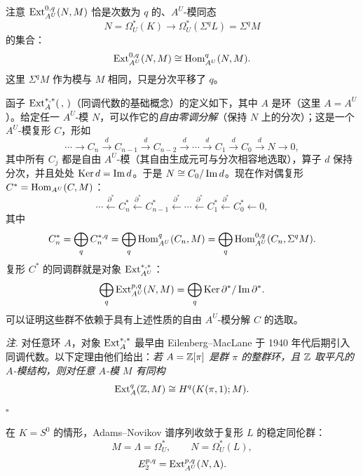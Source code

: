 注意 $\operatorname{Ext}_{A^U}^{0,q}(N,M)$ 恰是次数为 $q$ 的、$A^U$-模同态
\[
N=\Omega_U^*(K)\to\Omega_U^*(\Sigma^qL)=\Sigma^qM
\]
的集合：
\[
\operatorname{Ext}_{A^U}^{0,q}(N,M)\cong\operatorname{Hom}_{A^U}^q(N,M).
\]
这里 $\Sigma^qM$ 作为模与 $M$ 相同，只是分次平移了 $q$。

函子 $\operatorname{Ext}_A^{*,*}(\,,\,)$（同调代数的基础概念）的定义如下，其中 $A$ 是环（这里 $A=A^U$）。给定任一 $A^U$-模 $N$，可以作它的\emph{自由零调分解}（保持 $N$ 上的分次）；这是一个 $A^U$-模复形 $C$，形如
\[
\cdots\to C_n\xrightarrow{d}C_{n-1}\xrightarrow{d}C_{n-2}\xrightarrow{d}\cdots\xrightarrow{d}C_1\xrightarrow{d}C_0\xrightarrow{d}N\to0,
\]
其中所有 $C_j$ 都是自由 $A^U$-模（其自由生成元可与分次相容地选取），算子 $d$ 保持分次，并且处处 $\operatorname{Ker} d=\operatorname{Im} d$。于是 $N\cong C_0/\operatorname{Im} d$。现在作对偶复形 $C^*=\operatorname{Hom}_{A^U}(C,M)$：
\[
\cdots\xleftarrow{\partial^*}C_n^*\xleftarrow{\partial^*}C_{n-1}^*\xleftarrow{\partial^*}\cdots\xleftarrow{\partial^*}C_1^*\xleftarrow{\partial^*}C_0^*\leftarrow0,
\]
其中
\[
C_n^*=\bigoplus_qC_n^{*,q}=\bigoplus_q\operatorname{Hom}_{A^U}^q(C_n,M)=\bigoplus_q\operatorname{Hom}_{A^U}^{0,q}(C_n,\Sigma^qM).
\]
复形 $C^*$ 的同调群就是对象 $\operatorname{Ext}_{A^U}^{*,*}$：
\[
\bigoplus_q\operatorname{Ext}_{A^U}^{p,q}(N,M)=\bigoplus_q\operatorname{Ker}\partial^*/\operatorname{Im}\partial^*.
\]
可以证明这些群不依赖于具有上述性质的自由 $A^U$-模分解 $C$ 的选取。

\emph{注}. 对任意环 $A$，对象 $\operatorname{Ext}_A^{*,*}$ 最早由 Eilenberg--MacLane 于 1940 年代后期引入同调代数。以下定理由他们给出：\emph{若 $A=\mathbb{Z}[\pi]$ 是群 $\pi$ 的整群环，且 $\mathbb{Z}$ 取平凡的 $A$-模结构，则对任意 $A$-模 $M$ 有同构}
\[
\operatorname{Ext}_A^q(\mathbb{Z},M)\cong H^q(K(\pi,1);M).
\]
\hfill$\square$

在 $K=S^0$ 的情形，Adams--Novikov 谱序列收敛于复形 $L$ 的稳定同伦群：
\[
M=\Lambda=\Omega_U^*,\qquad N=\Omega_U^*(L),
\]
\[
E_2^{p,q}=\operatorname{Ext}_{A^U}^{p,q}(N,\Lambda).
\]

